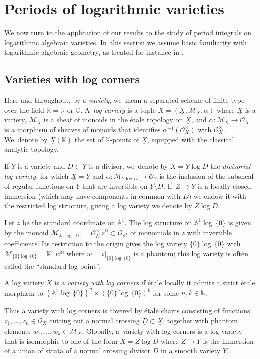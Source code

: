 \documentclass[JEP,XML,SOM,Unicode,NoFloatCountersInSection,published]{cedram}
\theoremstyle{definition}
\theoremstyle{remark}
\newenvironment{example}
  {\pushQED{\qed}\renewcommand{\qedsymbol}{$\lozenge$}\examplex}
  {\popQED\endexamplex}
\let\defn\emph
\newcommand{\CC}{\mathbb{C}}
\newcommand{\KK}{\mathbb{K}}
\newcommand{\RR}{\mathbb{R}}
\newcommand{\NN}{\mathbb{N}}
\newcommand{\AF}{\mathbb{A}}
\newcommand{\logcyl}{\AF^1 \log\, \{0\}}
\newcommand{\logcirc}{\{0\} \log\, \{0\}}
\newcommand{\cO}[1]{\mathcal{O}_{#1}}
\newcommand{\cOx}[1]{\cO{#1}^\times}
\newcommand{\cM}{\mathscr{M}}
\newcommand{\uX}{\underline{X}}
\newcommand{\uD}{\underline{D}}
\begin{document}
\section{Periods of logarithmic varieties}
\label{sec:periods}
We now turn to the application of our results to the study of period integrals on logarithmic algebraic varieties. In~this section we assume basic familiarity with logarithmic algebraic geometry, as treated for instance in \cite{Kato1989a,KatoNakayama,Ogus}.

\subsection{Varieties with log corners} Here and throughout, by a \defn{variety}, we~mean a separated scheme of finite type over the field $\KK =\RR$ or $\CC$. A~\defn{log variety} is a tuple $X = (\uX,\cM_X,\alpha)$ where $\uX$ is a variety, $\cM_X$ is a sheaf of monoids in the étale topology on $\uX$, and $\alpha \colon \cM_X \to \cO{X}$ is a morphism of sheaves of monoids that identifies $\alpha^{-1}(\cOx{X})$ with $\cOx{X}$. We~denote by $\uX(\KK)$ the set of $\KK$-points of $\uX$, equipped with the classical analytic topology.

If $Y$ is a variety and $D \subset Y$ is a divisor, we~denote by $X = Y \log D$ the \defn{divisorial log variety}, for which $\uX =Y$ and $\alpha \colon \cM_{Y \log D} \to \cO{Y}$ is the inclusion of the subsheaf of regular functions on $Y$ that are invertible on $Y \setminus D$. If~$Z \to Y$ is a locally closed immersion (which may have components in common with $D$) we endow it with the restricted log structure, giving a log variety we denote by $Z \log D$.

\begin{example}
Let $z$ be the standard coordinate on $\AF^1$. The log structure on $\logcyl$ is given by the monoid $\cM_{\logcyl}=\cOx{\AF^1} z^\NN \subset \cO{\AF^1}$ of monomials in $z$ with invertible coefficients. Its restriction to the origin gives the log variety $\logcirc$ with $\cM_{\logcirc} = \KK^\times w^\NN$ where $w = z|_{\logcirc}$ is a phantom; this log variety is often called the ``standard log point''.
\end{example}

\begin{definition}
A log variety $X$ is a \defn{variety with log corners} if étale locally it admits a strict étale morphism to $(\logcyl)^n \times (\logcirc)^k$ for some $n,k \in \NN$.
\end{definition}
Thus a variety with log corners is covered by étale charts consisting of functions $z_1,\ldots,z_n \in \cO{\uX}$ cutting out a normal crossing $\uD\subset \uX$, together with phantom elements $w_1,\ldots,w_k \in \cM_X$. Globally, a~variety with log corners is a log variety that is isomorphic to one of the form $X = Z \log D$ where $Z \to Y$ is the immersion of a union of strata of a normal crossing divisor $D$ in a smooth variety $Y$.
\end{document}
